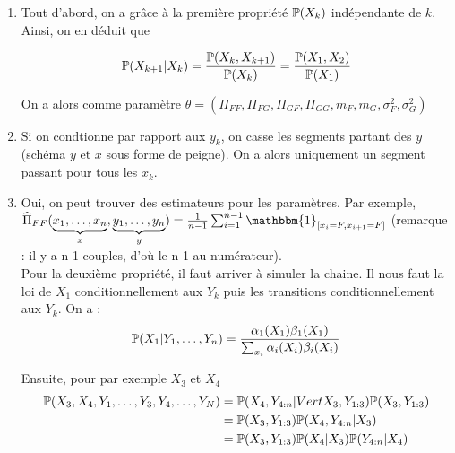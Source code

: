 \begin{enumerate}
  \item Tout d'abord, on a grâce à la première propriété $\P(X_k)$ indépendante de $k$. Ainsi, on en déduit que

    \[ \P(X_{k+1} \vert X_k) = \frac{\P(X_k,X_{k+1})}{\P(X_k)} = \frac{\P(X_1, X_2)}{\P(X_1)} \]

    On a alors comme paramètre $\theta=(\Pi_{FF}, \Pi_{FG}, \Pi_{GF}, \Pi_{GG}, m_F, m_G, \sigma_F^2, \sigma_G^2)$
  \item Si on condtionne par rapport aux $y_k$, on casse les segments partant des $y$ (schéma $y$ et $x$ sous forme de peigne). On a alors uniquement un segment passant pour tous les $x_k$.
  \item Oui, on peut trouver des estimateurs pour les paramètres. Par exemple, $\widehat{\Pi}_{FF}(\underbrace{x_1,\ldots,x_n}_{x},\underbrace{y_1,\ldots,y_n}_{y}) = \frac{1}{n-1} \sum_{i=1}^{n-1} \mathbbm{1}_{[x_i=F,x_{i+1} = F]}$ (remarque : il y a n-1 couples, d'où le n-1 au numérateur). \\
    Pour la deuxième propriété, il faut arriver à simuler la chaine. Il nous faut la loi de $X_1$ conditionnellement aux $Y_k$ puis les transitions conditionnellement aux $Y_k$. On a :
    \[ \P(X_1 \vert Y_1,\ldots,Y_n) = \frac{\alpha_1(X_1)\beta_1(X_1)}{\sum_{x_i} \alpha_i(X_i) \beta_i(X_i)} \]

    Ensuite, pour par exemple $X_3$ et $X_4$
    \begin{equation*}
    \begin{split}
      \P(X_3,X_4, Y_1,\ldots,Y_3,Y_4,\ldots,Y_N ) &= \P(X_4, Y_{4:n} |Vert X_3, Y_{1:3}) \P(X_3, Y_{1:3}) \\
      &= \P(X_3,Y_{1:3} ) \P(X_4, Y_{4:n} \vert X_3) \\
      &= \P(X_3,Y_{1:3}) \P(X_4 \vert X_3) \P(Y_{4:n} \vert X_4)
    \end{split}
    \end{equation*}
\end{enumerate}



